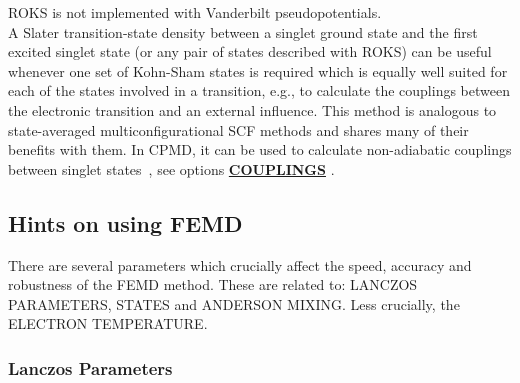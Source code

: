 \documentclass[twoside,10pt,titlepage,a4paper]{article}
\newcommand{\referto}[2]{\hyperlink{#1}{#2}}
\newcommand{\referto}[2]{\htmlref{#2}{#1}}
\newcommand{\refkeyword}[1]{%
\referto{#1}{\textbf{#1}}%
\index{#1}%
}%
\begin{document}
ROKS is not implemented with Vanderbilt pseudopotentials.\\

A Slater transition-state density between a singlet ground state and the
first excited singlet state (or any pair of states described with ROKS) can
be useful whenever one set of Kohn-Sham states is required which is equally
well suited for each of the states involved in a transition, e.g., to calculate
the couplings between the electronic transition and an external influence.
This method is analogous to state-averaged multiconfigurational SCF
methods and shares many of their benefits with them.
In CPMD, it can be used to calculate non-adiabatic couplings between singlet
states~\cite{nonadiabatic,lsets}, see options \refkeyword{COUPLINGS}.

\subsection{Hints on using FEMD}

  There are several parameters which crucially affect the speed, accuracy and
robustness of the FEMD method. These are related to: LANCZOS PARAMETERS, STATES
and ANDERSON MIXING. Less crucially, the ELECTRON TEMPERATURE.


\subsubsection{Lanczos Parameters}
\label{hints:lanczos}
\end{document}
